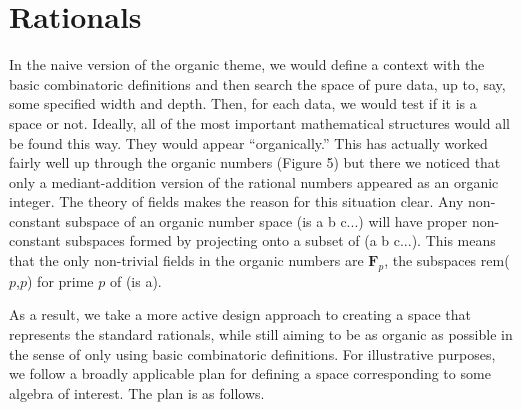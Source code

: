 \documentclass[11pt]{article}
\begin{document}
\section{Rationals} 

       In the naive version of the organic theme, we would define a context with the basic combinatoric definitions and then 
search the space of pure data, up to, say, some specified width and depth.  Then, for each data, we would test if it is 
a space or not.  Ideally, all of the most important mathematical structures would all be found this way.  They would appear ``organically.'' 
This has actually worked fairly well up through the organic numbers (Figure 5) but there we noticed that only a mediant-addition 
version of the rational numbers appeared as an organic integer.  The theory of fields makes the reason for this situation clear.  Any non-constant 
subspace of an organic number space (is a b c...) will have proper non-constant subspaces formed by 
projecting onto a subset of (a b c...).  This means that the only non-trivial fields in the organic numbers are ${\mathbf F}_p$, 
the subspaces rem($p$,$p$) for prime $p$ of (is a).  

       As a result, we take a more active design approach to creating a space that represents the standard rationals, while 
 still aiming to be as organic as possible in the sense of only using basic combinatoric definitions.  For illustrative purposes, 
 we follow a broadly applicable plan for defining a space corresponding to some algebra of interest.  The plan is as follows. 
 
\end{document}
